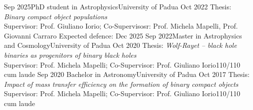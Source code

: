 %
%
%
\begin{experiences}
  \experiencenotags
    {Sep 2025}{PhD student in Astrophysics}{University of Padua}
    {Oct 2022}
    {Thesis: \textit{Binary compact object populations}    \\
    \smallskip
    Supervisor: Prof. Giuliano Iorio; Co-Supervisosr: Prof. Michela Mapelli, Prof. Giovanni Carraro
    }{Expected defence: Dec 2025}{}%
  \emptySeparator
  \experiencenotags
    {Sep 2022}{Master in Astrophysics and Cosmology}{University of Padua}
    {Oct 2020} 
    {Thesis: \textit{Wolf-Rayet -- black hole binaries as progenitors of binary black holes} \\
    Supervisor: Prof. Michela Mapelli; Co-Supervisor: Prof. Giuliano Iorio}{110/110 cum laude}
  \emptySeparator
  \experiencenotags
    {Sep 2020}   {Bachelor in Astronomy}{University of Padua}
    {Oct 2017} 
    {Thesis: \textit{Impact of mass transfer efficiency on the formation of binary compact objects} \\
    Supervisor: Prof. Michela Mapelli; Co-Supervisor: Prof. Giuliano Iorio}{110/110 cum laude}

\end{experiences}
